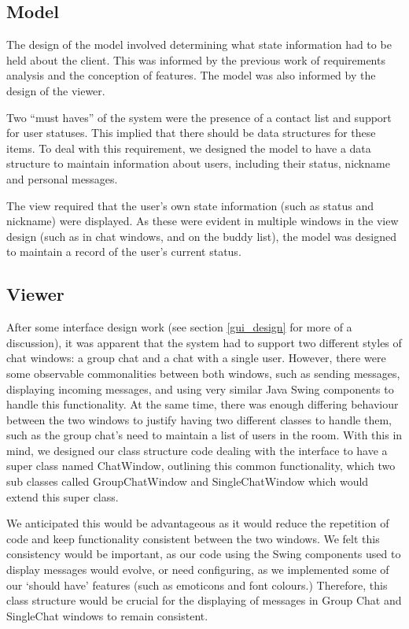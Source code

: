 \subsection {Model}
\label{model}

The design of the model involved determining what state information had to be held about the client. This was informed by the previous work of requirements analysis and the conception of features. The model was also informed by the design of the viewer.

Two ``must haves'' of the system were the presence of a contact list and support for user statuses. This implied that there should be data structures for these items. To deal with this requirement, we designed the model to have a data structure to maintain information about users, including their status, nickname and personal messages. 

The view required that the user's own state information (such as status and nickname) were displayed. As these were evident in multiple windows in the view design (such as in chat windows, and on the buddy list), the model was designed to maintain a record of the user's current status. 

\subsection {Viewer}

After some interface design work (see section \ref{gui_design} for more of a discussion), it was apparent that the system had to support two different styles of chat windows: a group chat and a chat with a single user. However, there were some observable commonalities between both windows, such as sending messages, displaying incoming messages, and using very similar Java Swing components to handle this functionality. At the same time, there was enough differing behaviour between the two windows to justify having two different classes to handle them, such as the group chat's need to maintain a list of users in the room. With this in mind, we designed our class structure code dealing with the interface to have a super class named ChatWindow, outlining this common functionality, which two sub classes called GroupChatWindow and SingleChatWindow which would extend this super class. 

We anticipated this would be advantageous as it would reduce the repetition of code and keep functionality consistent between the two windows. We felt this consistency would be important, as our code using the Swing components used to display messages would evolve, or need configuring, as we implemented some of our `should have' features (such as emoticons and font colours.) Therefore, this class structure would be crucial for the displaying of messages in Group Chat and SingleChat windows to remain consistent.

